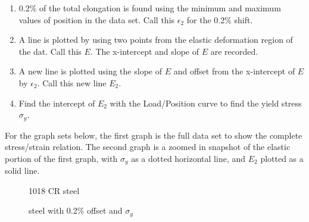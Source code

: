 \documentclass{article}
\begin{document}
\begin{enumerate}
	\item 0.2\% of the total elongation is found using the minimum and maximum  values of position in the data set. Call this $\epsilon_2$ for the 0.2\% shift.
	\item A line is plotted by using two points from the elastic deformation region of the dat. Call this $E$. The x-intercept and slope of $E$ are recorded.
	\item A new line is plotted using the slope of $E$ and offset from the x-intercept of $E$ by $\epsilon_2$. Call this new line $E_2$.
	\item Find the intercept of $E_2$ with the Load/Position curve to find the yield stress $\sigma_y$.
\end{enumerate}

For the graph sets below, the first graph is the full data set to show the complete stress/strain relation. The second graph is a zoomed in snapshot of the elastic portion of the first graph, with $\sigma_y$ as a dotted horizontal line, and $E_2$ plotted as a solid line.

\begin{center}
\begin{figure}
\begin{center}
    \caption{1018 CR steel}
    \label{tab:graph1}
\end{center}
\end{figure}
\begin{figure}
\begin{center}
	\caption{steel with 0.2\% offset and $\sigma_y$}
	\label{tab:graph2}
\end{center}
\end{figure}
\end{center}
\end{document}
